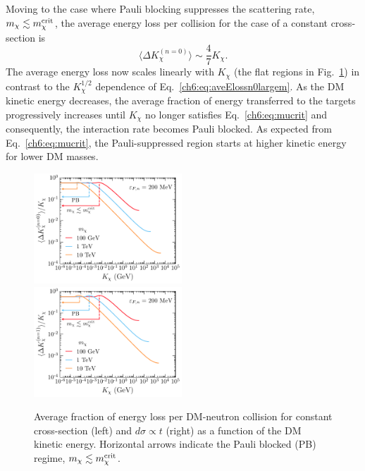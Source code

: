 Moving to the case where Pauli blocking suppresses the scattering rate, $m_\chi\lesssim m_\chi^{\rm crit}$, the average energy loss per collision for the case of a constant cross-section is
\begin{equation}
\langle \Delta K_\chi^{(n=0)} \rangle \sim 
\frac{4}{7}K_\chi. 
\label{ch6:eq:aveElossn0}
\end{equation}
The average energy loss now scales linearly with $K_\chi$ (the flat regions in Fig.~\ref{ch6:fig:Taven0}) in contrast to the $K_\chi^{1/2}$ dependence of Eq.~\ref{ch6:eq:aveElossn0largem}.
As the DM kinetic energy decreases, the average fraction of energy transferred to the targets progressively increases until $K_\chi$ no longer satisfies Eq.~\ref{ch6:eq:mucrit} and consequently, the interaction rate becomes Pauli blocked.
As expected from Eq.~\ref{ch6:eq:mucrit}, the Pauli-suppressed region starts at higher kinetic energy for lower DM masses. 


\begin{figure}[t!bp]
  \centering
  \includegraphics[width=0.495\textwidth]{q0ave_Tdm_n0.pdf}
  \includegraphics[width=0.495\textwidth]{q0ave_Tdm_n1.pdf}
  \caption{Average fraction of energy loss per DM-neutron collision for constant cross-section (left) and $d\sigma\propto t$ (right) as a function of the DM kinetic energy. Horizontal arrows indicate the Pauli blocked (PB) regime, $m_\chi\lesssim m_\chi^{\rm crit}$. 
  } 
  \label{ch6:fig:Taven0}
\end{figure}




